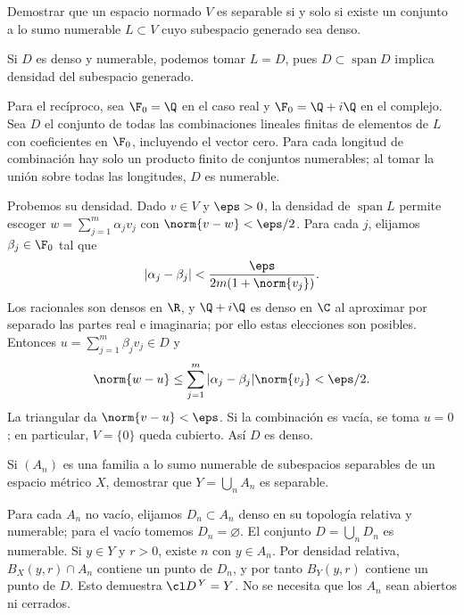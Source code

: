 \begin{ejercicio}
Demostrar que un espacio normado $V$ es separable si y solo si existe un conjunto a lo sumo numerable $L\subset V$ cuyo subespacio generado sea denso.
\end{ejercicio}
\begin{solucion}
Si $D$ es denso y numerable, podemos tomar $L=D$, pues $D\subset\operatorname{span}D$ implica densidad del subespacio generado.

Para el recíproco, sea $\F_0=\Q$ en el caso real y $\F_0=\Q+i\Q$ en el complejo. Sea $D$ el conjunto de todas las combinaciones lineales finitas de elementos de $L$ con coeficientes en $\F_0$, incluyendo el vector cero. Para cada longitud de combinación hay solo un producto finito de conjuntos numerables; al tomar la unión sobre todas las longitudes, $D$ es numerable.

Probemos su densidad. Dado $v\in V$ y $\eps>0$, la densidad de $\operatorname{span}L$ permite escoger $w=\sum_{j=1}^m\alpha_jv_j$ con $\norm{v-w}<\eps/2$. Para cada $j$, elijamos $\beta_j\in\F_0$ tal que
\[
|\alpha_j-\beta_j|<\frac{\eps}{2m(1+\norm{v_j})}.
\]
Los racionales son densos en $\R$, y $\Q+i\Q$ es denso en $\C$ al aproximar por separado las partes real e imaginaria; por ello estas elecciones son posibles. Entonces $u=\sum_{j=1}^m\beta_jv_j\in D$ y
\[
\norm{w-u}\le\sum_{j=1}^m|\alpha_j-\beta_j|\norm{v_j}<\eps/2.
\]
La triangular da $\norm{v-u}<\eps$. Si la combinación es vacía, se toma $u=0$; en particular, $V=\{0\}$ queda cubierto. Así $D$ es denso.
\end{solucion}

\begin{ejercicio}
Si $(A_n)$ es una familia a lo sumo numerable de subespacios separables de un espacio métrico $X$, demostrar que $Y=\bigcup_nA_n$ es separable.
\end{ejercicio}
\begin{solucion}
Para cada $A_n$ no vacío, elijamos $D_n\subset A_n$ denso en su topología relativa y numerable; para el vacío tomemos $D_n=\varnothing$. El conjunto $D=\bigcup_nD_n$ es numerable. Si $y\in Y$ y $r>0$, existe $n$ con $y\in A_n$. Por densidad relativa, $B_X(y,r)\cap A_n$ contiene un punto de $D_n$, y por tanto $B_Y(y,r)$ contiene un punto de $D$. Esto demuestra $\cl D^{\,Y}=Y$. No se necesita que los $A_n$ sean abiertos ni cerrados.
\end{solucion}

